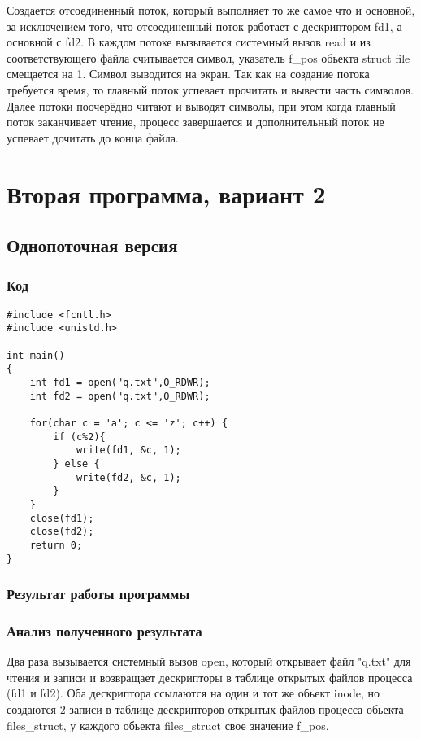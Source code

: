 Создается отсоединенный поток, который выполняет то же самое что и основной, за исключением того, что отсоединенный поток работает с дескриптором fd1, а основной с fd2. В каждом потоке вызывается системный вызов read и из соответствующего файла считывается символ, указатель f\_pos обьекта struct file смещается на 1. Символ выводится на экран. Так как на создание потока требуется время, то главный поток успевает прочитать и вывести часть символов. Далее потоки поочерёдно читают и выводят символы, при этом когда главный поток заканчивает чтение, процесс завершается и дополнительный поток не успевает дочитать до конца файла.

\chapter{Вторая программа, вариант 2}
\section{Однопоточная версия}
\subsection{Код}
\begin{lstlisting}[caption={Программа 2, вариант 2, однопоточная версия}, label=lst:p22_one]
#include <fcntl.h>
#include <unistd.h>

int main() 
{
	int fd1 = open("q.txt",O_RDWR);
	int fd2 = open("q.txt",O_RDWR);
	
	for(char c = 'a'; c <= 'z'; c++) {
		if (c%2){
			write(fd1, &c, 1);
		} else {
			write(fd2, &c, 1);
		}
	}
	close(fd1);
	close(fd2);
	return 0;
}
\end{lstlisting}

\subsection{Результат работы программы}
\FloatBarrier
{}
\FloatBarrier

\subsection{Анализ полученного результата}

Два раза вызывается системный вызов open, который открывает файл "q.txt" для чтения и записи и возвращает дескрипторы в таблице открытых файлов процесса (fd1 и fd2). Оба дескриптора ссылаются на один и тот же обьект inode, но создаются 2 записи в таблице дескрипторов открытых файлов процесса обьекта files\_struct, у каждого обьекта files\_struct свое значение f\_pos.

